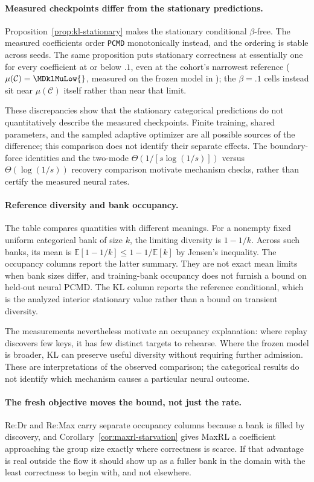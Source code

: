 \documentclass{article}
\newcommand{\1}{\mathbf 1}
\newcommand{\E}{\mathbb E}
\newcommand{\pmd}{\texttt{PCMD}}
\theoremstyle{remark}
\theoremstyle{definition}
\theoremstyle{plain}
\begin{document}
\paragraph{Measured checkpoints differ from the stationary predictions.}
Proposition~\ref{prop:kl-stationary} makes the stationary conditional
$\beta$-free. The measured coefficients order \pmd{} monotonically instead, and
the ordering is stable across seeds. The same proposition puts stationary
correctness at essentially one for every coefficient at or below $.1$, even at
the cohort's narrowest reference ($\mu(\mathcal C)=\MDklMuLow{}$, measured on
the frozen model in \MDklMuLowDomain{}); the $\beta=.1$ cells instead sit near
$\mu(\mathcal C)$ itself rather than near that limit.

These discrepancies show that the stationary categorical predictions do
not quantitatively describe the measured checkpoints. Finite training,
shared parameters, and the sampled adaptive optimizer are all possible
sources of the difference; this comparison does not identify their separate
effects. The boundary-force identities and the two-mode
$\Theta(1/[s\log(1/s)])$ versus $\Theta(\log(1/s))$ recovery comparison
motivate mechanism checks, rather than certify the measured neural rates.

\paragraph{Reference diversity and bank occupancy.}
The table compares quantities with different meanings. For a nonempty fixed
uniform categorical bank of size $k$, the limiting diversity is $1-1/k$.
Across such banks, its mean is $\E[1-1/k]\le1-1/\E[k]$ by Jensen's
inequality. The occupancy columns report the latter summary. They are not
exact mean limits when bank sizes differ, and training-bank occupancy does
not furnish a bound on held-out neural PCMD.
The KL column reports the reference conditional, which is the analyzed
interior stationary value rather than a bound on transient diversity.

The measurements nevertheless motivate an occupancy explanation: where
replay discovers few keys, it has few distinct targets to rehearse.
Where the frozen model is broader, KL can preserve useful diversity without
requiring further admission. These are interpretations of the observed
comparison; the categorical results do not identify which mechanism
causes a particular neural outcome.

\paragraph{The fresh objective moves the bound, not just the rate.}
Re:Dr and Re:Max carry separate occupancy columns because a bank is filled by
discovery, and Corollary~\ref{cor:maxrl-starvation} gives MaxRL a coefficient
approaching the group size exactly where correctness is scarce. If that
advantage is real outside the flow it should show up as a fuller bank in the
domain with the least correctness to begin with, and not elsewhere.
\end{document}

